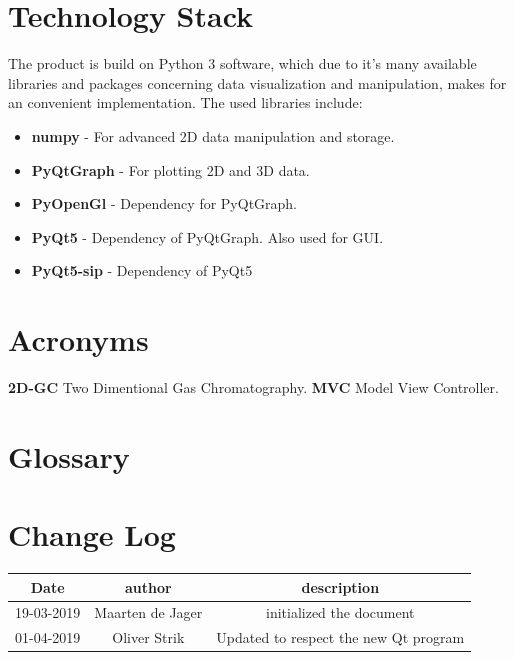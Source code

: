 \documentclass{article}
\begin{document}
\section*{Technology Stack}
The product is build on Python 3 software, which due to it's many available libraries and packages concerning data visualization and manipulation, makes for an convenient implementation. The used libraries include:

\begin{itemize}
    \item \textbf{numpy} - For advanced 2D data manipulation and storage.
    \item \textbf{PyQtGraph} - For plotting 2D and 3D data.
    \item \textbf{PyOpenGl} - Dependency for PyQtGraph.
    \item \textbf{PyQt5} - Dependency of PyQtGraph. Also used for GUI.
    \item \textbf{PyQt5-sip} - Dependency of PyQt5
\end{itemize}

\section*{Acronyms}

\textbf{2D-GC} Two Dimentional Gas Chromatography.
\textbf{MVC} Model View Controller.

\section*{Glossary}


\section*{Change Log}

\begin{tabular}{|c|c|c|}
     \hline
     Date& author & description \\
     \hline
     19-03-2019 & Maarten de Jager & initialized the document \\
     \hline
     01-04-2019 & Oliver Strik & Updated to respect the new Qt program \\
     \hline
\end{tabular}
\end{document}
